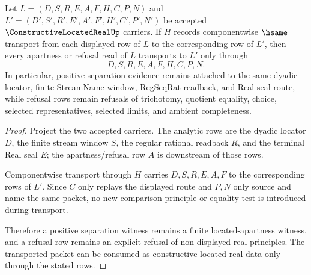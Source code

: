 \begin{theorem}
\label{thm:constructive-located-real-apartness-stability}
Let $L=(D,S,R,E,A,F,H,C,P,N)$ and $L'=(D',S',R',E',A',F',H',C',P',N')$ be accepted $\ConstructiveLocatedRealUp$ carriers. If $H$ records componentwise $\hsame$ transport from each displayed row of $L$ to the corresponding row of $L'$, then every apartness or refusal read of $L$ transports to $L'$ only through
$$
D,S,R,E,A,F,H,C,P,N .
$$
In particular, positive separation evidence remains attached to the same dyadic locator, finite StreamName window, RegSeqRat readback, and Real seal route, while refusal rows remain refusals of trichotomy, quotient equality, choice, selected representatives, selected limits, and ambient completeness.
\end{theorem}
\begin{proof}
Project the two accepted carriers. The analytic rows are the dyadic locator $D$, the finite stream window $S$, the regular rational readback $R$, and the terminal Real seal $E$; the apartness/refusal row $A$ is downstream of those rows.

Componentwise transport through $H$ carries $D,S,R,E,A,F$ to the corresponding rows of $L'$. Since $C$ only replays the displayed route and $P,N$ only source and name the same packet, no new comparison principle or equality test is introduced during transport.

Therefore a positive separation witness remains a finite located-apartness witness, and a refusal row remains an explicit refusal of non-displayed real principles. The transported packet can be consumed as constructive located-real data only through the stated rows.
\end{proof}

